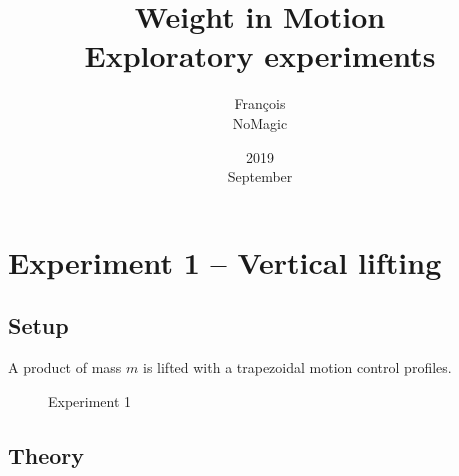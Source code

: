 \documentclass[a4paper,11pt]{article}
\title{Weight in Motion \\ Exploratory experiments}
\date{2019\\ September}
\author{François\\ NoMagic}
\begin{document}

\maketitle

\section{Experiment 1 – Vertical lifting}

\subsection{Setup}

A product of mass \(m\) is lifted with a trapezoidal motion control profiles.

\begin{figure}[H]
  \begin{center}

  \end{center}
  \caption{Experiment 1}
\label{fig:tikz:experiment1}
\end{figure}


\subsection{Theory}
\end{document}

